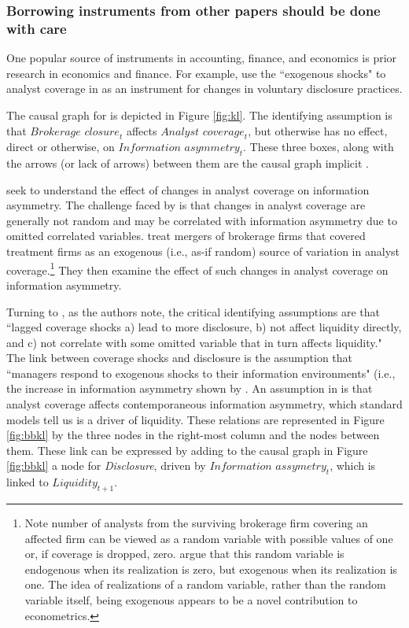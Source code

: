 \documentclass[11pt,reqno]{amsart}
\begin{document}
\begin{doublespace}
\subsubsection{Borrowing instruments from other papers should be done with care}
One popular source of instruments in accounting, finance, and economics is prior research in economics and finance.
For example, \citet{Balakrishnan:2014js} use the ``exogenous shocks" to analyst coverage in \citet{Kelly:2012ih} as an instrument for changes in voluntary disclosure practices. 

The causal graph for \citet{Kelly:2012ih} is depicted in Figure \ref{fig:kl}.
The identifying assumption is that $\textit{Brokerage closure}_t$ affects $\textit{Analyst coverage}_t$, but otherwise has no effect, direct or otherwise, on $\textit{Information asymmetry}_t$.
These three boxes, along with the arrows (or lack of arrows) between them are the causal graph implicit \citet{Kelly:2012ih}.


\citet{Kelly:2012ih} seek to understand the effect of changes in analyst coverage on information asymmetry. 
The challenge faced by \citet{Kelly:2012ih} is that changes in analyst coverage are generally not random and may be correlated with information asymmetry due to omitted correlated variables.
\citet{Kelly:2012ih} treat mergers of brokerage firms that covered treatment firms as an exogenous (i.e., as-if random) source of variation in analyst coverage.\footnote{Note number of analysts from the surviving brokerage firm covering an affected firm can be viewed as a random variable with possible values of one or, if coverage is dropped, zero. \citet{Kelly:2012ih} argue that this random variable is endogenous when its realization is zero, but exogenous when its realization is one. 
The idea of realizations of a random variable, rather than the random variable itself, being exogenous appears to be a novel contribution to econometrics.} 
They then examine the effect of such changes in analyst coverage on information asymmetry.

Turning to \citet{Balakrishnan:2014js}, as the authors note, the critical identifying assumptions are that ``lagged coverage shocks a) lead to more disclosure, b) not affect liquidity directly, and c) not correlate with some omitted variable that in turn affects liquidity." 
The link between coverage shocks and disclosure is the assumption that ``managers respond to exogenous shocks to their information environments" (i.e., the increase in information asymmetry shown by  \citet{Kelly:2012ih}.
An assumption in \citet{Kelly:2012ih} is that analyst coverage affects contemporaneous information asymmetry, which standard models tell us is a driver of liquidity.
These relations are represented in Figure \ref{fig:bbkl} by the three nodes in the right-most column and the nodes between them.
These link can be expressed by adding to the causal graph in Figure \ref{fig:bbkl} a node for \textit{Disclosure}, driven by $\textit{Information assymetry}_t$, which is linked to $\textit{Liquidity}_{t+1}$.


\end{doublespace}
\end{document}
